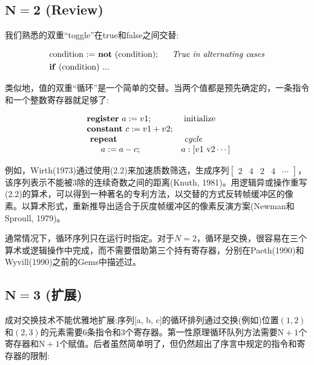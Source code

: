 \begin{CJK}{UTF8}{gbsn}
\subsection*{$\mathbf{N=2}$ (Review)}
我们熟悉的双重“toggle”在true和false之间交替:


\begin{align}
\begin{aligned}
&\text { condition := \textbf{not} (condition); } \quad \textit { True in alternating cases } \\
&\text { \textbf{if} (condition) } . . .
\end{aligned}
\end{align}

类似地，值的双重“循环”是一个简单的交替。当两个值都是预先确定的，一条指令和一个整数寄存器就足够了:



$$
\begin{array}{ll}
\text { \textbf{register}  } a:=v 1 ; & \text { initialize } \\
\text { \textbf{constant}  } c:=v 1+v 2 ; & \\
\text { \textbf{ repeat} } & \textit { cycle } \\
\qquad a:=a-c ; & a:[v 1 \text { v2} \cdots]
\end{array}
$$

例如，Wirth(1973)通过使用(2.2)来加速质数筛选，生成序列$\left[\begin{array}{lllll}2 & 4 & 2 & 4 & \cdots \end{array} \right]$，该序列表示不能被3除的连续奇数之间的距离(Knuth, 1981)。用逻辑异或操作重写(2.2)的算术，可以得到一种著名的专利方法，以交替的方式反转帧缓冲区的像素。以算术形式，重新推导出适合于灰度帧缓冲区的像素反演方案(Newman和Sproull, 1979)。

通常情况下，循环序列只在运行时指定。对于$N=2$，循环是交换，很容易在三个算术或逻辑操作中完成，而不需要借助第三个持有寄存器，分别在Paeth(1990)和Wyvill(1990)之前的Gems中描述过。

\subsection*{$\mathbf{ N=3}$ (扩展)}
成对交换技术不能优雅地扩展:序列[a, b, c]的循环排列通过交换(例如)位置$(1,2)$和$(2,3)$的元素需要6条指令和3个寄存器。第一性原理循环队列方法需要$\mathrm{N}+1$个寄存器和$\mathrm{N}+1$个赋值。后者虽然简单明了，但仍然超出了序言中规定的指令和寄存器的限制:


\end{CJK}
